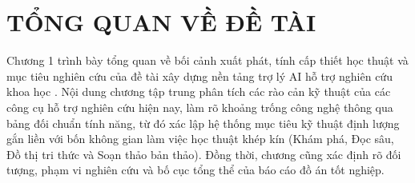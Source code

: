 \chapter{TỔNG QUAN VỀ ĐỀ TÀI}
\label{ch:tong_quan}

Chương 1 trình bày tổng quan về bối cảnh xuất phát, tính cấp thiết học thuật và mục tiêu nghiên cứu của đề tài xây dựng nền tảng trợ lý AI hỗ trợ nghiên cứu khoa học \VS. Nội dung chương tập trung phân tích các rào cản kỹ thuật của các công cụ hỗ trợ nghiên cứu hiện nay, làm rõ khoảng trống công nghệ thông qua bảng đối chuẩn tính năng, từ đó xác lập hệ thống mục tiêu kỹ thuật định lượng gắn liền với bốn không gian làm việc học thuật khép kín (Khám phá, Đọc sâu, Đồ thị tri thức và Soạn thảo bản thảo). Đồng thời, chương cũng xác định rõ đối tượng, phạm vi nghiên cứu và bố cục tổng thể của báo cáo đồ án tốt nghiệp.








